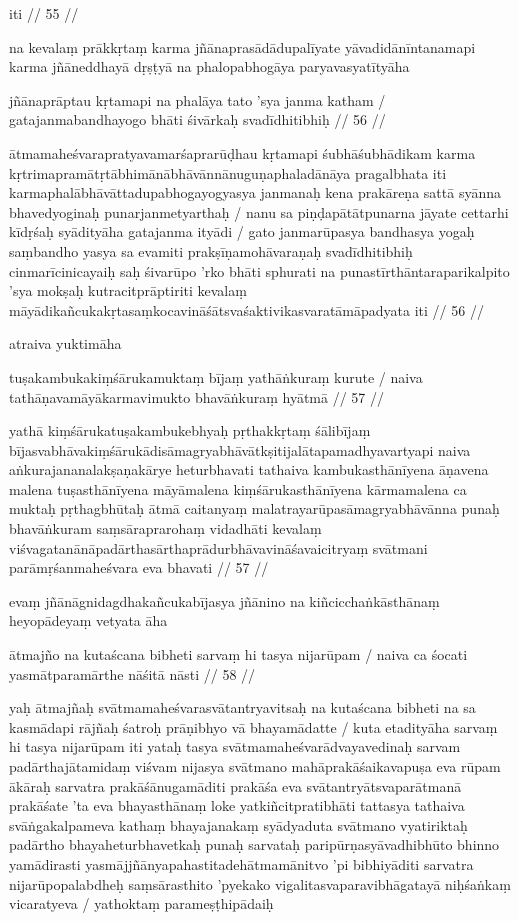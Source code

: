 iti  // 55  //

na kevalaṃ prākkṛtaṃ karma jñānaprasādādupalīyate yāvadidānīntanamapi karma jñāneddhayā dṛṣṭyā na phalopabhogāya paryavasyatītyāha

jñānaprāptau kṛtamapi na phalāya tato 'sya janma katham  /
gatajanmabandhayogo bhāti śivārkaḥ svadīdhitibhiḥ  // 56  //

ātmamaheśvarapratyavamarśaprarūḍhau kṛtamapi śubhāśubhādikam karma kṛtrimapramātṛtābhimānābhāvānnānuguṇaphaladānāya pragalbhata iti karmaphalābhāvāttadupabhogayogyasya janmanaḥ kena prakāreṇa sattā syānna bhavedyoginaḥ punarjanmetyarthaḥ  / nanu sa piṇḍapātātpunarna jāyate cettarhi kīdṛśaḥ syādityāha gatajanma ityādi  / gato janmarūpasya bandhasya yogaḥ saṃbandho yasya sa evamiti prakṣīṇamohāvaraṇaḥ svadīdhitibhiḥ cinmarīcinicayaiḥ saḥ śivarūpo 'rko bhāti sphurati na punastīrthāntaraparikalpito 'sya mokṣaḥ kutracitprāptiriti kevalaṃ māyādikañcukakṛtasaṃkocavināśātsvaśaktivikasvaratāmāpadyata iti  // 56  //

atraiva yuktimāha

tuṣakambukakiṃśārukamuktaṃ bījaṃ yathāṅkuraṃ kurute  /
naiva tathāṇavamāyākarmavimukto bhavāṅkuraṃ hyātmā  // 57  //

yathā kiṃśārukatuṣakambukebhyaḥ pṛthakkṛtaṃ śālibījaṃ bījasvabhāvakiṃśārukādisāmagryabhāvātkṣitijalātapamadhyavartyapi naiva aṅkurajananalakṣaṇakārye heturbhavati tathaiva kambukasthānīyena āṇavena malena tuṣasthānīyena māyāmalena kiṃśārukasthānīyena kārmamalena ca muktaḥ pṛthagbhūtaḥ ātmā caitanyaṃ malatrayarūpasāmagryabhāvānna punaḥ bhavāṅkuram saṃsāraprarohaṃ vidadhāti kevalaṃ viśvagatanānāpadārthasārthaprādurbhāvavināśavaicitryaṃ svātmani parāmṛśanmaheśvara eva bhavati  // 57  //

evaṃ jñānāgnidagdhakañcukabījasya jñānino na kiñcicchaṅkāsthānaṃ heyopādeyaṃ vetyata āha

ātmajño na kutaścana bibheti sarvaṃ hi tasya nijarūpam  /
naiva ca śocati yasmātparamārthe nāśitā nāsti  // 58  //

yaḥ ātmajñaḥ svātmamaheśvarasvātantryavitsaḥ na kutaścana bibheti na sa kasmādapi rājñaḥ śatroḥ prāṇibhyo vā bhayamādatte  / kuta etadityāha sarvaṃ hi tasya nijarūpam iti yataḥ tasya svātmamaheśvarādvayavedinaḥ sarvam padārthajātamidaṃ viśvam nijasya svātmano mahāprakāśaikavapuṣa eva rūpam ākāraḥ sarvatra prakāśānugamāditi prakāśa eva svātantryātsvaparātmanā prakāśate 'ta eva bhayasthānaṃ loke yatkiñcitpratibhāti tattasya tathaiva svāṅgakalpameva kathaṃ bhayajanakaṃ syādyaduta svātmano vyatiriktaḥ padārtho bhayaheturbhavetkaḥ punaḥ sarvataḥ paripūrṇasyāvadhibhūto bhinno yamādirasti yasmājjñānyapahastitadehātmamānitvo 'pi bibhiyāditi sarvatra nijarūpopalabdheḥ saṃsārasthito 'pyekako vigalitasvaparavibhāgatayā niḥśaṅkaṃ vicaratyeva  / yathoktaṃ parameṣṭhipādaiḥ

